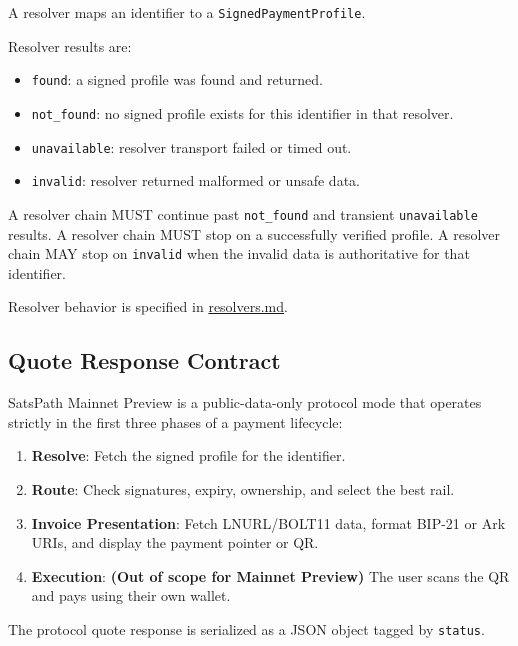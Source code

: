 \documentclass[
]{article}
\providecommand{\tightlist}{%
  \setlength{\itemsep}{0pt}\setlength{\parskip}{0pt}}
\begin{document}
A resolver maps an identifier to a \texttt{SignedPaymentProfile}.

Resolver results are:

\begin{itemize}
\tightlist
\item
  \texttt{found}: a signed profile was found and returned.
\item
  \texttt{not\_found}: no signed profile exists for this identifier in
  that resolver.
\item
  \texttt{unavailable}: resolver transport failed or timed out.
\item
  \texttt{invalid}: resolver returned malformed or unsafe data.
\end{itemize}

A resolver chain MUST continue past \texttt{not\_found} and transient
\texttt{unavailable} results. A resolver chain MUST stop on a
successfully verified profile. A resolver chain MAY stop on
\texttt{invalid} when the invalid data is authoritative for that
identifier.

Resolver behavior is specified in \href{./resolvers.md}{resolvers.md}.

\hypertarget{quote-response-contract}{%
\subsection{Quote Response Contract}\label{quote-response-contract}}

SatsPath Mainnet Preview is a public-data-only protocol mode that
operates strictly in the first three phases of a payment lifecycle:

\begin{enumerate}
\def\labelenumi{\arabic{enumi}.}
\tightlist
\item
  \textbf{Resolve}: Fetch the signed profile for the identifier.
\item
  \textbf{Route}: Check signatures, expiry, ownership, and select the
  best rail.
\item
  \textbf{Invoice Presentation}: Fetch LNURL/BOLT11 data, format BIP-21
  or Ark URIs, and display the payment pointer or QR.
\item
  \textbf{Execution}: \textbf{(Out of scope for Mainnet Preview)} The
  user scans the QR and pays using their own wallet.
\end{enumerate}

The protocol quote response is serialized as a JSON object tagged by
\texttt{status}.
\end{document}

